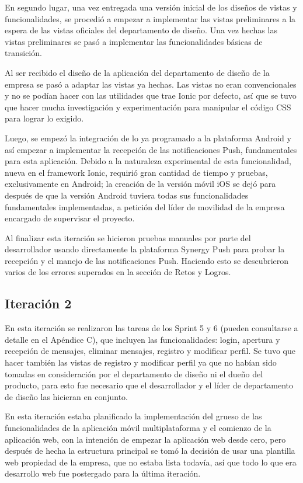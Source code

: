 En segundo lugar, una vez entregada una versión inicial de los diseños de vistas y funcionalidades, se procedió a empezar a implementar las vistas preliminares a la espera de las vistas oficiales del departamento de diseño. Una vez hechas las vistas preliminares se pasó a implementar las funcionalidades básicas de transición.


Al ser recibido el diseño de la aplicación del departamento de diseño de la empresa se pasó a adaptar las vistas ya hechas. Las vistas no eran convencionales y no se podían hacer con las utilidades que trae Ionic por defecto, así que se tuvo que hacer mucha investigación y experimentación para manipular el código CSS para lograr lo exigido.


Luego, se empezó la integración de lo ya programado a la plataforma Android y así empezar a implementar la recepción de las notificaciones Push, fundamentales para esta aplicación. Debido a la naturaleza experimental de esta funcionalidad, nueva en el framework Ionic, requirió gran cantidad de tiempo y pruebas, exclusivamente en Android; la creación de la versión móvil iOS se dejó para después de que la versión Android tuviera todas sus funcionalidades fundamentales implementadas, a petición del líder de movilidad de la empresa encargado de supervisar el proyecto.


Al finalizar esta iteración se hicieron pruebas manuales por parte del desarrollador usando directamente la plataforma Synergy Push para probar la recepción y el manejo de las notificaciones Push. Haciendo esto se descubrieron varios de los errores superados en la sección de Retos y Logros.


\subsection{Iteración 2}
En esta iteración se realizaron las tareas de los Sprint 5 y 6 (pueden consultarse a detalle en el Apéndice C), que incluyen las funcionalidades: login, apertura y recepción de mensajes, eliminar mensajes, registro y modificar perfil. Se tuvo que hacer también las vistas de registro y modificar perfil ya que no habían sido tomadas en consideración por el departamento de diseño ni el dueño del producto, para esto fue necesario que el desarrollador y el líder de departamento de diseño las hicieran en conjunto.


En esta iteración estaba planificado la implementación del grueso de las funcionalidades de la aplicación móvil multiplataforma y el comienzo de la aplicación web, con la intención de empezar la aplicación web desde cero, pero después de hecha la estructura principal se tomó la decisión de usar una plantilla web propiedad de la empresa, que no estaba lista todavía, así que todo lo que era desarrollo web fue postergado para la última iteración.



